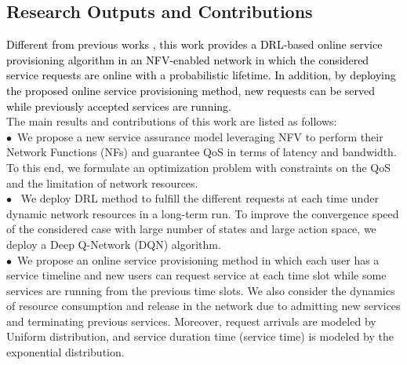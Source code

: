 \documentclass[20pt,twocolumn]{IEEEtran}
\begin{document}
	\subsection{{Research Outputs and Contributions}}
	\textcolor{black}{Different from previous works \cite{zhang2019deep,10.1145/3326285.3329056,gholipoor2020e2e}, this work provides a DRL-based online service provisioning algorithm in an NFV-enabled network	in which the considered service requests are online with a probabilistic lifetime. In addition, by deploying the proposed online	service provisioning method, new requests can be served while	previously accepted services are running.}\\
The main results and contributions of this work are
listed as follows:
\\$\bullet$~We propose a new service assurance model  leveraging NFV  to perform their Network Functions (NFs) and guarantee  QoS  in terms of latency and bandwidth. To this end, we formulate an optimization problem with constraints on the QoS and the limitation of network resources.
\\$\bullet$~
We deploy DRL method
 to fulfill the different requests at each time under dynamic network resources  in a long-term run.
  To improve the convergence speed of the considered case with large number  of states and large action space, we deploy a Deep Q-Network (DQN) algorithm.  %
\\$\bullet$~We propose an online service provisioning method in which each user has a service timeline and new users can request service at each time slot while some services are running from the previous time slots. We also consider the dynamics of resource consumption and release in the network due to admitting new services and terminating previous services. Moreover, request arrivals are modeled by Uniform distribution, and service duration time (service time) is modeled by the exponential distribution. 
\end{document}

